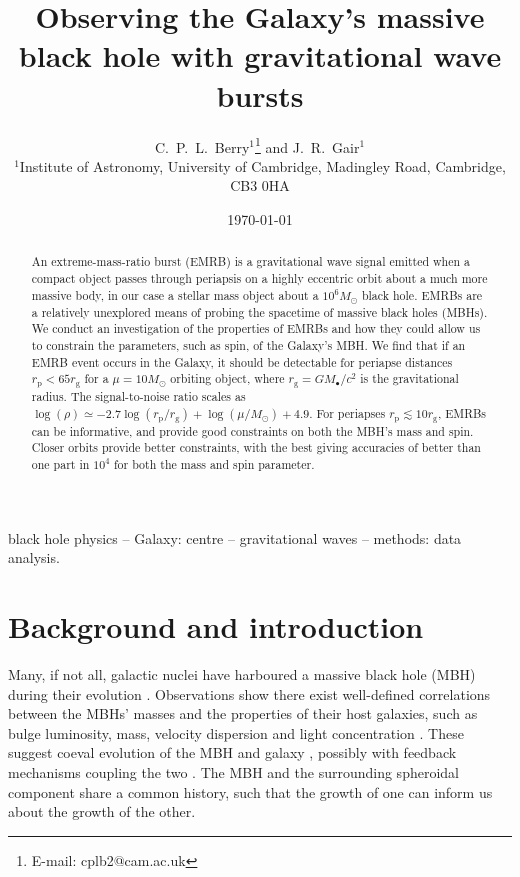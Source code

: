 \documentclass[useAMS,usedcolumn,usegraphicx,usenatbib]{mn2e}
\title[Observing the Galaxy's MBH with GW bursts]{Observing the Galaxy's massive black hole with gravitational wave bursts}
\author[C.\ P.\ L.\ Berry and J.\ R.\ Gair]{C.\ P.\ L.\ Berry$^{1}$\thanks{E-mail: cplb2@cam.ac.uk}  and J.\ R.\ Gair$^{1}$\\
$^{1}$Institute of Astronomy, University of Cambridge, Madingley Road, Cambridge, CB3 0HA}
\newcommand{\sub}[1]{\ensuremath{_\mathrm{#1}}}
\begin{document}
\date{\today}

\pagerange{\pageref{firstpage}--\pageref{lastpage}} 

\maketitle

\label{firstpage}

\begin{abstract}
An extreme-mass-ratio burst (EMRB) is a gravitational wave signal emitted when a compact object passes through periapsis on a highly eccentric orbit about a much more massive body, in our case a stellar mass object about a $10^6 M_\odot$ black hole. EMRBs are a relatively unexplored means of probing the spacetime of massive black holes (MBHs). We conduct an investigation of the properties of EMRBs and how they could allow us to constrain the parameters, such as spin, of the Galaxy's MBH. We find that if an EMRB event occurs in the Galaxy, it should be detectable for periapse distances $r\sub{p} < 65 r\sub{g}$ for a $\mu = 10 M_\odot$ orbiting object, where $r\sub{g} = GM_\bullet/c^2$ is the gravitational radius. The signal-to-noise ratio scales as $\log(\rho) \simeq -2.7\log(r\sub{p}/r\sub{g}) + \log(\mu/M_\odot) + 4.9$. For periapses $r\sub{p} \lesssim 10 r\sub{g}$, EMRBs can be informative, and provide good constraints on both the MBH's mass and spin. Closer orbits provide better constraints, with the best giving accuracies of better than one part in $10^4$ for both the mass and spin parameter.
\end{abstract}

\begin{keywords}
black hole physics -- Galaxy: centre -- gravitational waves -- methods: data analysis.
\end{keywords}

\section{Background and introduction}\label{sec:Intro}

Many, if not all, galactic nuclei have harboured a massive black hole (MBH) during their evolution \citep{Lynden-Bell1971, Rees1984}. Observations show there exist well-defined correlations between the MBHs' masses and the properties of their host galaxies, such as bulge luminosity, mass, velocity dispersion and light concentration \citep[e.g.][]{Kormendy1995, Magorrian1998, Graham2001, Tremaine2002, Graham2011}. These suggest coeval evolution of the MBH and galaxy \citep{Peng2007, Jahnke2011}, possibly with feedback mechanisms coupling the two \citep{Haiman2004, Volonteri2009}. The MBH and the surrounding spheroidal component share a common history, such that the growth of one can inform us about the growth of the other.
\end{document}

